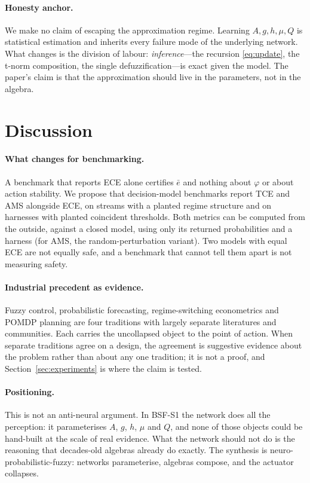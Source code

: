 \documentclass[11pt,a4paper]{article}
\numberwithin{equation}{section}
\theoremstyle{plain}
\theoremstyle{definition}
\theoremstyle{remark}
\begin{document}
\paragraph{Honesty anchor.} We make no claim of escaping the approximation regime. Learning $A,g,h,\mu,Q$ is statistical estimation and inherits every failure mode of the underlying network. What changes is the division of labour: \emph{inference}---the recursion \eqref{eq:update}, the t-norm composition, the single defuzzification---is exact given the model. The paper's claim is that the approximation should live in the parameters, not in the algebra.

\section{Discussion}\label{sec:discussion}

\paragraph{What changes for benchmarking.} A benchmark that reports ECE alone certifies $\bar e$ and nothing about $\varphi$ or about action stability. We propose that decision-model benchmarks report TCE and AMS alongside ECE, on streams with a planted regime structure and on harnesses with planted coincident thresholds. Both metrics can be computed from the outside, against a closed model, using only its returned probabilities and a harness (for AMS, the random-perturbation variant). Two models with equal ECE are not equally safe, and a benchmark that cannot tell them apart is not measuring safety.

\paragraph{Industrial precedent as evidence.} Fuzzy control, probabilistic forecasting, regime-switching econometrics and POMDP planning are four traditions with largely separate literatures and communities. Each carries the uncollapsed object to the point of action. When separate traditions agree on a design, the agreement is suggestive evidence about the problem rather than about any one tradition; it is not a proof, and Section~\ref{sec:experiments} is where the claim is tested.

\paragraph{Positioning.} This is not an anti-neural argument. In BSF-S1 the network does all the perception: it parameterises $A$, $g$, $h$, $\mu$ and $Q$, and none of those objects could be hand-built at the scale of real evidence. What the network should not do is the reasoning that decades-old algebras already do exactly. The synthesis is neuro-probabilistic-fuzzy: networks parameterise, algebras compose, and the actuator collapses.
\end{document}
